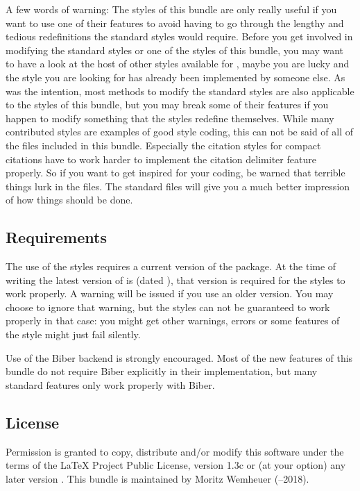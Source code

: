 \documentclass[DIV=9]{scrartcl}
\makeatletter
\def\lppl{LaTeX Project Public License}%
\newcommand*{\biblatexversion}{\extblx@requiredbiblatexversion}
\newcommand*{\biblatexdate}{\extblx@requiredbiblatexdate}
\newcommand*{\biber}{Biber}
\makeatother
\begin{document}
A few words of warning:
The styles of this bundle are only really useful if you want to use one of their
features to avoid having to go through the lengthy and tedious redefinitions the
standard styles would require.
Before you get involved in modifying the standard styles or one of the styles
of this bundle, you may want to have a look at the host of other styles
available for ,
maybe you are lucky and the style you are looking for has already been
implemented by someone else.
As was the intention, most methods to modify the standard styles are also
applicable to the styles of this bundle, but you may break some of their
features if you happen to modify something that the  styles redefine
themselves.
While many contributed  styles are examples of good 
style coding, this can not be said of all of the files included in this bundle.
Especially the citation styles for compact citations have to work harder
to implement the citation delimiter feature properly.
So if you want to get inspired for your  coding, be warned that
terrible things lurk in the  files.
The standard  files will give you a much better impression of how
things should be done.


\subsection{Requirements}\label{sec:req}
The use of the styles requires a current version of the  package.
At the time of writing the latest version of  is
\biblatexversion{} (dated \biblatexdate),
that version is required for the styles to work properly.
A warning will be issued if you use an older version.
You may choose to ignore that warning, but the styles can not be guaranteed to
work properly in that case:
you might get other warnings, errors or some features of the style might just
fail silently.

Use of the \biber{} backend is strongly encouraged.
Most of the new features of this bundle do not require \biber{} explicitly in
their implementation, but many  standard features only work
properly with \biber{}.

\subsection{License}\label{sec:license}
Permission is granted to copy, distribute and\slash or modify this software
under the terms of the \lppl, version 1.3c%
or (at your option) any later version%
.
This bundle is maintained by Moritz Wemheuer (--2018).
\end{document}
